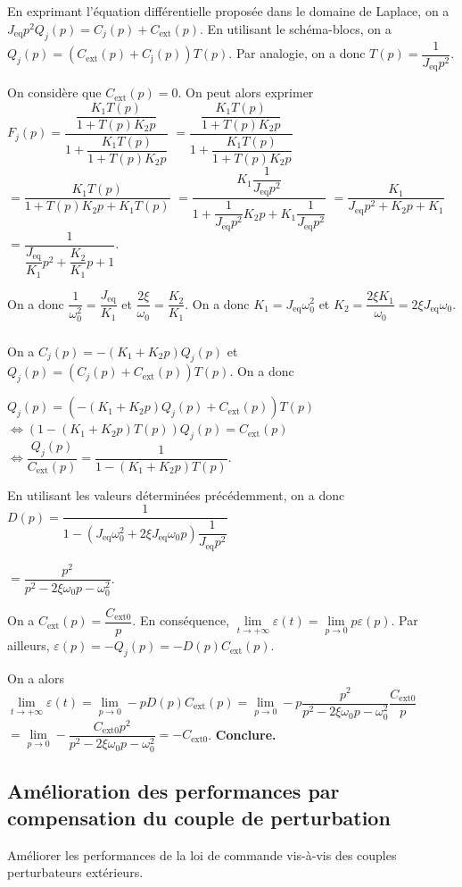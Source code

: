 \documentclass[10pt,fleqn]{article} %
\begin{document}
\subparagraph{}%
En exprimant l'équation différentielle proposée dans le domaine de Laplace, on a 
$J_{\text{eq}} p^2{Q}_j(p)=C_j(p)+C_{\text{ext}}(p)$.
En utilisant le schéma-blocs, on a $Q_j(p)=\left(C_{\text{ext}}(p)+C_{\text{j}}(p)\right)T(p)$. 
Par analogie, on a donc $T(p)=\dfrac{1}{J_{\text{eq}}p^2}$.

On considère que $C_{\text{ext}}(p)=0$.  On peut alors exprimer 
$F_j(p)= \dfrac{\dfrac{K_1T(p)}{1+T(p)K_2 p} }{1+\dfrac{K_1T(p)}{1+T(p)K_2 p}}$
$= \dfrac{\dfrac{K_1T(p)}{1+T(p)K_2 p} }{1+\dfrac{K_1T(p)}{1+T(p)K_2 p}}$
$= \dfrac{K_1T(p) }{1+T(p)K_2 p+K_1T(p)}$
$= \dfrac{K_1\dfrac{1}{J_{\text{eq}}p^2}}{1+\dfrac{1}{J_{\text{eq}}p^2}K_2 p+K_1\dfrac{1}{J_{\text{eq}}p^2}}$
$= \dfrac{K_1}{J_{\text{eq}}p^2+K_2 p+K_1}$
$= \dfrac{1}{\dfrac{J_{\text{eq}}}{K_1}p^2+\dfrac{K_2}{K_1}p+1}$.

On a donc $\dfrac{1}{\omega_0^2}=\dfrac{J_{\text{eq}}}{K_1}$ et $\dfrac{2\xi}{\omega_0}=\dfrac{K_2}{K_1}$. On a donc $K_1=J_{\text{eq}}\omega_0^2$ et $K_2=\dfrac{2\xi K_1}{\omega_0}=2\xi J_{\text{eq}}\omega_0$.

\subparagraph{}%
On a $C_j(p)=-\left(K_1+K_2 p\right) Q_j(p)$ et $Q_j(p)=\left(C_j(p)+C_{\text{ext}}(p)\right)T(p)$.  On a donc  

$Q_j(p)=\left(-\left(K_1+K_2 p\right) Q_j(p)+C_{\text{ext}}(p)\right)T(p)$
$\Leftrightarrow \left(1-\left(K_1+K_2 p\right)T(p) \right)Q_j(p)=C_{\text{ext}}(p)$
$\Leftrightarrow \dfrac{Q_j(p)}{C_{\text{ext}}(p)}=\dfrac{1}{1-\left(K_1+K_2 p\right)T(p) }$.

En utilisant les valeurs déterminées précédemment, on a donc $D(p)=\dfrac{1}{1-\left(J_{\text{eq}}\omega_0^2+2\xi J_{\text{eq}}\omega_0 p\right)\dfrac{1}{J_{\text{eq}}p^2} }$

$=\dfrac{p^2}{p^2-2\xi\omega_0 p-\omega_0^2 }$.

On a $C_{\text{ext}}(p)=\dfrac{C_{\text{ext} 0}}{p}$. En conséquence, 
$\lim\limits_{t\to +\infty} \varepsilon(t) = \lim\limits_{p\to 0} p\varepsilon(p)$.
Par ailleurs,  $\varepsilon(p)=-Q_j(p)=-D(p)C_{\text{ext}}(p)$.

On a alors $\lim\limits_{t\to +\infty} \varepsilon(t) = \lim\limits_{p\to 0} -pD(p)C_{\text{ext}}(p)= \lim\limits_{p\to 0} -p\dfrac{p^2}{p^2-2\xi\omega_0 p-\omega_0^2 }\dfrac{C_{\text{ext} 0}}{p}$
$= \lim\limits_{p\to 0} -\dfrac{C_{\text{ext} 0}p^2}{p^2-2\xi\omega_0 p-\omega_0^2 }  = -C_{\text{ext} 0}$.
\textbf{Conclure.}


\subsection{Amélioration des performances par compensation du couple de perturbation}
\begin{obj}
Améliorer les performances de la loi de commande vis-à-vis des couples perturbateurs extérieurs.
\end{obj}
\end{document}
